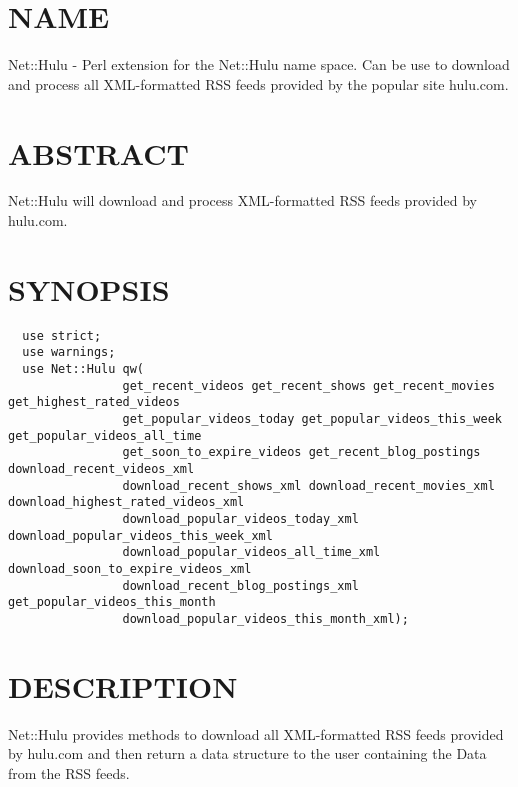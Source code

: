 \section{NAME\label{NAME}}


Net::Hulu - Perl extension for the Net::Hulu name space.  Can be use to download
and process all XML-formatted RSS feeds provided by the popular site hulu.com.

\section{ABSTRACT\label{ABSTRACT}}


Net::Hulu will download and process XML-formatted RSS feeds provided by hulu.com.

\section{SYNOPSIS\label{SYNOPSIS}}
\begin{verbatim}
  use strict;
  use warnings;
  use Net::Hulu qw(
                get_recent_videos get_recent_shows get_recent_movies get_highest_rated_videos
                get_popular_videos_today get_popular_videos_this_week get_popular_videos_all_time
                get_soon_to_expire_videos get_recent_blog_postings download_recent_videos_xml
                download_recent_shows_xml download_recent_movies_xml download_highest_rated_videos_xml
                download_popular_videos_today_xml download_popular_videos_this_week_xml
                download_popular_videos_all_time_xml download_soon_to_expire_videos_xml
                download_recent_blog_postings_xml get_popular_videos_this_month
                download_popular_videos_this_month_xml);
\end{verbatim}
\section{DESCRIPTION\label{DESCRIPTION}}


Net::Hulu provides methods to download all XML-formatted RSS feeds provided by hulu.com and 
then return a data structure to the user containing the Data from the RSS feeds.



